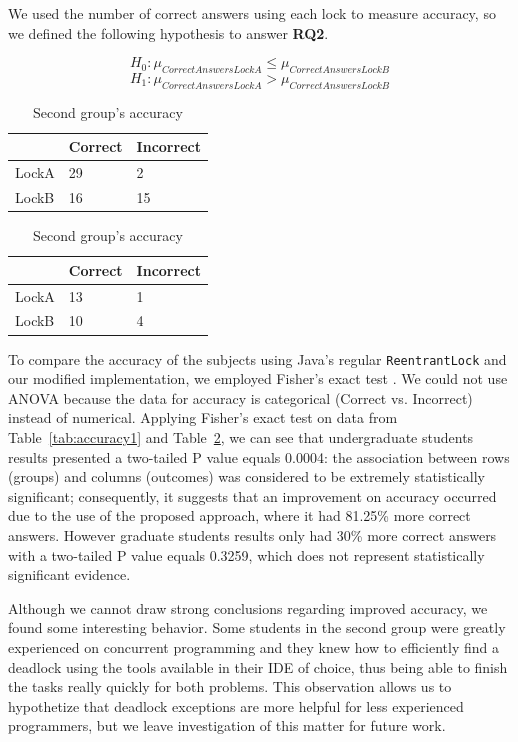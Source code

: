We used the number of correct answers using each lock to measure accuracy, so we defined the following hypothesis to answer {\bf RQ2}. 

\begin{equation}
  H_{0} : \mu_{CorrectAnswersLockA} \leq \mu_{CorrectAnswersLockB}
\end{equation}
\begin{equation}
  H_{1} : \mu_{CorrectAnswersLockA} > \mu_{CorrectAnswersLockB}
\end{equation}

\begin{table}
\parbox{.45\linewidth}{
\centering
\begin{tabular}{|l|l|l|}
\hline
 & Correct & Incorrect\\
\hline
LockA & 29 & 2\\
LockB & 16 & 15\\
\hline
\end{tabular}
\caption{First group's accuracy}\label{tab:accuracy1}
}
\hfill
\parbox{.45\linewidth}{
\centering
\begin{tabular}{|l|l|l|}
\hline
 & Correct & Incorrect\\
\hline
LockA & 13 & 1\\
LockB & 10 & 4\\
\hline
\end{tabular}
\caption{Second group's accuracy}\label{tab:accuracy2}
}
\end{table}

To compare the accuracy of the subjects using Java's regular {\tt ReentrantLock} and our modified implementation, we employed Fisher's exact test \cite{agresti}. We could not use ANOVA because the data for accuracy is categorical (Correct vs. Incorrect) instead of numerical. 
Applying Fisher's exact test on data from Table~\ref{tab:accuracy1} and Table~\ref{tab:accuracy2}, we can see that undergraduate students results presented a two-tailed P value equals 0.0004: the association between rows (groups) and columns (outcomes) was considered to be extremely statistically significant; consequently, it suggests that an improvement on accuracy occurred due to the use of the proposed approach, where it had 81.25\% more correct answers. However graduate students results only had 30\% more correct answers with a two-tailed P value equals 0.3259, which does not represent statistically significant evidence.

Although we cannot draw strong conclusions regarding improved accuracy, we found some interesting behavior. Some students in the second group were greatly experienced on concurrent programming and they knew how to efficiently find a deadlock using the tools available in their IDE of choice, thus being able to finish the tasks really quickly for both problems. This observation allows us to hypothetize that deadlock exceptions are more helpful for less experienced programmers, but we leave investigation of this matter for future work.

